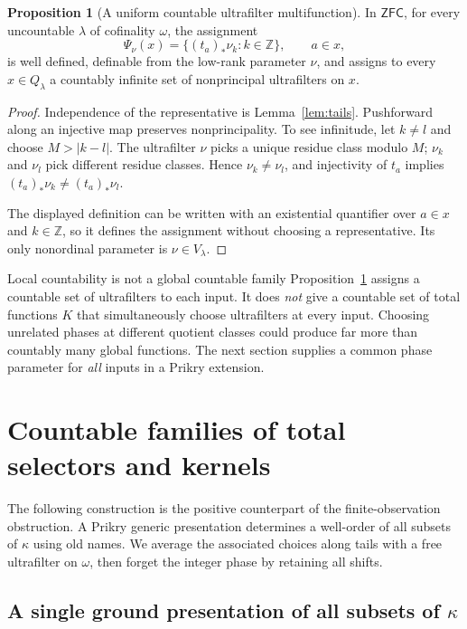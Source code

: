 \documentclass[11pt,letterpaper]{article}
\theoremstyle{definition}
\newtheorem{proposition}[definition]{Proposition}
\numberwithin{equation}{section}
\newcommand{\ZFC}{\mathsf{ZFC}}
\begin{document}
\begin{proposition}[A uniform countable ultrafilter multifunction]\label{prop:local}
In $\ZFC$, for every uncountable $\lambda$ of cofinality $\omega$, the assignment
\[
\Psi_\nu(x)=\{(t_a)_*\nu_k:k\in\mathbb Z\},\qquad a\in x,
\]
is well defined, definable from the low-rank parameter $\nu$, and assigns to every $x\in Q_\lambda$ a countably infinite set of nonprincipal ultrafilters on $x$.
\end{proposition}
\begin{proof}
Independence of the representative is Lemma~\ref{lem:tails}. Pushforward along an injective map preserves nonprincipality. To see infinitude, let $k\ne l$ and choose $M>|k-l|$. The ultrafilter $\nu$ picks a unique residue class modulo $M$; $\nu_k$ and $\nu_l$ pick different residue classes. Hence $\nu_k\ne\nu_l$, and injectivity of $t_a$ implies $(t_a)_*\nu_k\ne(t_a)_*\nu_l$.

The displayed definition can be written with an existential quantifier over $a\in x$ and $k\in\mathbb Z$, so it defines the assignment without choosing a representative. Its only nonordinal parameter is $\nu\in V_\lambda$.
\end{proof}

\begin{assessment}{Local countability is not a global countable family}
Proposition~\ref{prop:local} assigns a countable set of ultrafilters to each input. It does \emph{not} give a countable set of total functions $K$ that simultaneously choose ultrafilters at every input. Choosing unrelated phases at different quotient classes could produce far more than countably many global functions. The next section supplies a common phase parameter for \emph{all} inputs in a Prikry extension.
\end{assessment}

\section{Countable families of total selectors and kernels}\label{sec:global}

The following construction is the positive counterpart of the finite-observation obstruction. A Prikry generic presentation determines a well-order of all subsets of $\kappa$ using old names. We average the associated choices along tails with a free ultrafilter on $\omega$, then forget the integer phase by retaining all shifts.

\subsection{A single ground presentation of all subsets of \texorpdfstring{$\kappa$}{kappa}}
\end{document}
